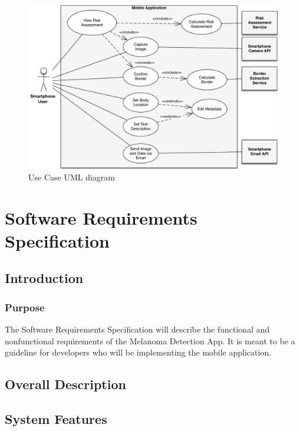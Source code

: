         \begin{figure}[H]
            \centering
            \includegraphics[width=\textwidth]{assets/requirements//uc/UML.pdf}
            \caption{Use Case UML diagram}
            \label{fig:uml}
        \end{figure}

        


\section{Software Requirements Specification}

    \subsection{Introduction}
        \subsubsection{Purpose}

            The Software Requirements Specification will describe the functional and nonfunctional requirements of the Melanoma Detection App. It is meant to be a guideline for developers who will be implementing the mobile application.

    \subsection{Overall Description}
        

    \subsection{System Features}
        

